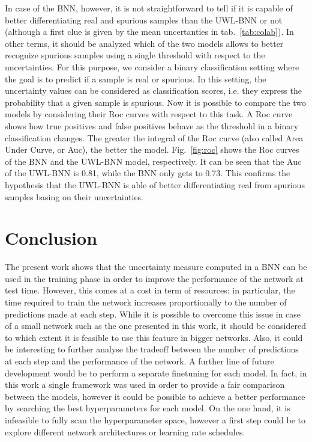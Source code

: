 \documentclass[11pt,twoside,a4paper]{article}
\begin{document}
In case of the BNN, however, it is not straightforward to tell if it is capable of better differentiating real and spurious samples than the UWL-BNN or not (although a first clue is given by the mean uncertanties in tab.~\ref{tab:colab}). In other terms, it should be analyzed which of the two models allows to better recognize spurious samples using a single threshold with respect to the uncertainties.\newline
For this purpose, we consider a binary classification setting where the goal is to predict if a sample is real or spurious. In this setting, the uncertainty values can be considered as classification scores, i.e. they express the probability that a given sample is spurious. Now it is possible to compare the two models by considering their Roc curves with respect to this task. A Roc curve shows how true positives and false positives behave as the threshold in a binary classification changes. The greater the integral of the Roc curve (also called Area Under Curve, or Auc), the better the model.\newline
Fig.~\ref{fig:roc} shows the Roc curves of the BNN and the UWL-BNN model, respectively. It can be seen that the Auc of the UWL-BNN is 0.81, while the BNN only gets to 0.73. This confirms the hypothesis that the UWL-BNN is able of better differentiating real from spurious samples basing on their uncertainties.

\section{Conclusion}
The present work shows that the uncertainty measure computed in a BNN can be used in the training phase in order to improve the performance of the network at test time. However, this comes at a cost in term of resources: in particular, the time required to train the network increases proportionally to the number of predictions made at each step. While it is possible to overcome this issue in case of a small network such as the one presented in this work, it should be considered to which extent it is feasible to use this feature in bigger networks. Also, it could be interesting to further analyse the tradeoff between the number of predictions at each step and the performance of the network.\newline
A further line of future development would be to perform a separate finetuning for each model. In fact, in this work a single framework was used in order to provide a fair comparison between the models, however it could be possible to achieve a better performance by searching the best hyperparameters for each model. On the one hand, it is infeasible to fully scan the hyperparameter space, however a first step could be to explore different network architectures or learning rate schedules.

\newpage


 
\end{document}
